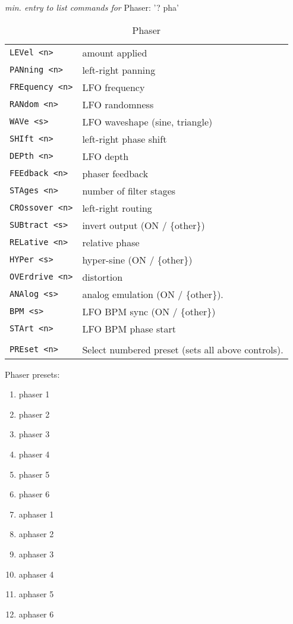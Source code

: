 \pagebreak
   \textsl{min. entry to list commands for} Phaser:  '? pha'
   \begin{table}[H]
      \centering
      \caption{Phaser}
      \begin{tabular}{l l}
\texttt{LEVel <n>} &
   amount applied \\
\texttt{PANning <n>} &
   left-right panning \\
\texttt{FREquency <n>} &
   LFO frequency \\
\texttt{RANdom <n>} &
   LFO randomness \\
\texttt{WAVe <s>} &
   LFO waveshape (sine, triangle) \\
\texttt{SHIft <n>} &
   left-right phase shift \\
\texttt{DEPth <n>} &
   LFO depth \\
\texttt{FEEdback <n>} &
   phaser feedback \\
\texttt{STAges <n>} &
   number of filter stages \\
\texttt{CROssover <n>} &
   left-right routing \\
\texttt{SUBtract <s>} &
   invert output (ON / \{other\}) \\
\texttt{RELative <n>} &
   relative phase \\
\texttt{HYPer <s>} &
   hyper-sine (ON / \{other\}) \\
\texttt{OVErdrive <n>} &
   distortion \\
\texttt{ANAlog <s>} &
   analog emulation  (ON / \{other\}). \\
\texttt{BPM <s>} &
   LFO BPM sync (ON / \{other\}) \\
\texttt{STArt <n>} &
   LFO BPM phase start \\
\texttt{} & \\ %
\texttt{PREset <n>} &
   Select numbered preset (sets all above controls). \\
      \end{tabular}
   \end{table}
Phaser presets:
   \begin{enumerate}
   \item phaser 1
   \item phaser 2
   \item phaser 3
   \item phaser 4
   \item phaser 5
   \item phaser 6
   \item aphaser 1
   \item aphaser 2
   \item aphaser 3
   \item aphaser 4
   \item aphaser 5
   \item aphaser 6
   \end{enumerate}


